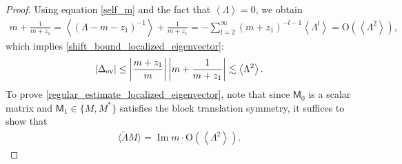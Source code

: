 \documentclass[10pt,reqno]{amsart}
\numberwithin{equation}{section}
\numberwithin{figure}{section}
\theoremstyle{plain} %
\theoremstyle{definition} %
\newcommand{\wt}{\widetilde}
\renewcommand{\txt}[1]{\text{\rm{#1}}}
\newcommand{\sM}{\mathsf M}
\renewcommand{\leq}{\le}
\newcommand{\pa}[1]{\left({#1}\right)}
\newcommand{\absa}[1]{\left\lvert #1 \right\rvert}
\newcommand{\avg}[1]{\langle #1 \rangle}
\newcommand{\avga}[1]{\left\langle #1 \right\rangle}
\DeclareMathOperator{\im}{\mathrm{Im}}
\newcommand{\tLambda}{{\wt{\Lambda}}}
\newcommand{\OO}{\mathrm{O}}
\newcommand{\opr}[1]{\mathrm{O}_\prec\left({#1}\right)}
\numberwithin{equation}{section}
\begin{document}
 \begin{proof}
 Using equation \eqref{self_m} and the fact that $\avga{\Lambda}=0$, we obtain 
    \begin{equation}\nonumber
        \begin{aligned}
            m+\frac{1}{m+z_1}=\avga{\pa{\Lambda-m-z_1}^{-1}}+\frac{1}{m+z_1}=-\sum_{l=2}^{\infty} \pa{m+z_1}^{-l-1}\avga{\Lambda^l}=\OO\pa{\avga{\Lambda^2}},
        \end{aligned}
    \end{equation}
which implies \eqref{shift_bound_localized_eigenvector}: 
    \begin{equation}\nonumber
        \begin{aligned}
            \absa{\Delta_{\txt{ev}}}\leq \absa{\frac{m+z_1}{m}}\absa{m+\frac{1}{m+z_1}}\lesssim \avga{\Lambda^2}.
        \end{aligned}
    \end{equation}
    To prove \eqref{regular_estimate_localized_eigenvector}, note that since $\sM_0$ is a scalar matrix and $\sM_1\in\{M,M^*\}$ satisfies the block translation symmetry, it suffices to show that
    \begin{equation}\label{eq:cancel_pf}
        \begin{aligned}
            \avg{\tLambda M}=\im m \cdot \OO\pa{\avga{\Lambda^2}}.
        \end{aligned}
    \end{equation}
    

\end{proof}
\end{document}
